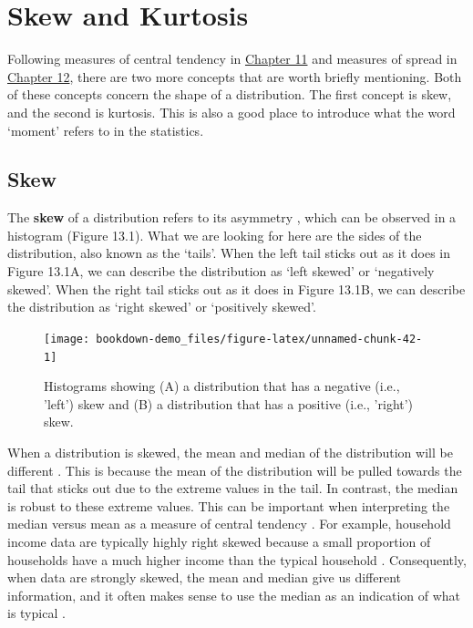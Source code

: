 \documentclass[
  openany]{krantz}
\begin{document}
\hypertarget{skew-and-kurtosis}{%
\chapter{Skew and Kurtosis}\label{skew-and-kurtosis}}

Following measures of central tendency in \protect\hyperlink{Chapter_11}{Chapter 11} and measures of spread in \protect\hyperlink{Chapter_12}{Chapter 12}, there are two more concepts that are worth briefly mentioning.
Both of these concepts concern the shape of a distribution.
The first concept is skew, and the second is kurtosis.
This is also a good place to introduce what the word `moment' refers to in the statistics.

\hypertarget{skew}{%
\section{Skew}\label{skew}}

The \textbf{skew} of a distribution refers to its asymmetry \citep{Sokal1995, Dytham2011}, which can be observed in a histogram (Figure 13.1).
What we are looking for here are the sides of the distribution, also known as the `tails'.
When the left tail sticks out as it does in Figure 13.1A, we can describe the distribution as `left skewed' or `negatively skewed'.
When the right tail sticks out as it does in Figure 13.1B, we can describe the distribution as `right skewed' or `positively skewed'.

\begin{figure}
\texttt{[image: bookdown-demo\_files/figure-latex/unnamed-chunk-42-1]} \caption{Histograms showing (A) a distribution that has a negative (i.e., 'left') skew and (B) a distribution that has a positive (i.e., 'right') skew.}\label{fig:unnamed-chunk-42}
\end{figure}

When a distribution is skewed, the mean and median of the distribution will be different \citep{Sokal1995}.
This is because the mean of the distribution will be pulled towards the tail that sticks out due to the extreme values in the tail.
In contrast, the median is robust to these extreme values.
This can be important when interpreting the median versus mean as a measure of central tendency \citep{Reichmann1970}.
For example, household income data are typically highly right skewed because a small proportion of households have a much higher income than the typical household \citep{Mcdonald2013}.
Consequently, when data are strongly skewed, the mean and median give us different information, and it often makes sense to use the median as an indication of what is typical \citep{Chiripanhura2011}.
\end{document}
